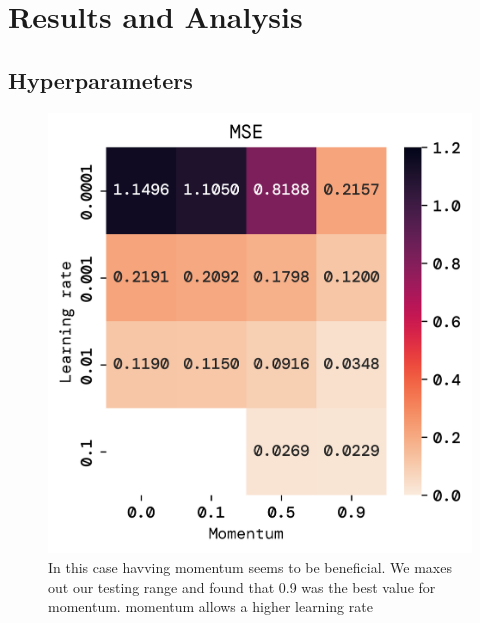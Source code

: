 \documentclass[twoside,11pt]{report}
\begin{document}
\section*{Results and Analysis}
\label{sec:resultsdiscussion2}




\subsection*{Hyperparameters}
\label{sec:hyperparameters2}


    \begin{figure}[!ht]
        \begin{minipage}[t]{0.5\textwidth - 1mm}
            \begin{center}
                \includegraphics[width=\textwidth]{../runsAndFigures/MSE_lr_gamma.png}
            \end{center}
            \caption{In this case havving momentum seems to be beneficial. 
            We maxes out our testing range and found that 0.9 was the best value for momentum. 
            momentum allows a higher learning rate}\label{fig:MSE_lr_gamma}
        \end{minipage}
        \hspace{2mm}
        \begin{minipage}[t]{0.5\textwidth - 1mm}

\end{minipage}
\end{figure}
\end{document}
